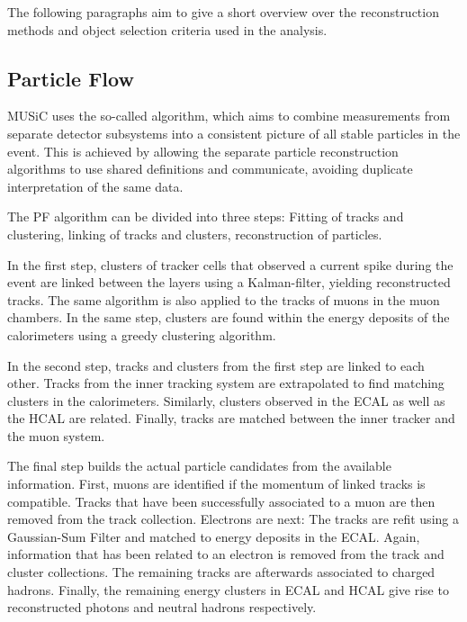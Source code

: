 The following paragraphs aim to give a short overview over the reconstruction methods and object selection criteria used in the analysis. 

\subsection{Particle Flow}
\ac{MUSiC} uses the so-called  algorithm\cite{CMS:CMS-PAS-PFT-09-001}, which aims to combine measurements from separate detector subsystems into a consistent picture of all stable particles in the event. This is achieved by allowing the separate particle reconstruction algorithms to use shared definitions and communicate, avoiding duplicate interpretation of the same data.

The \ac{PF} algorithm can be divided into three steps: Fitting of tracks and clustering, linking of tracks and clusters, reconstruction of particles.

In the first step, clusters of tracker cells that observed a current spike during the event are linked between the layers using a Kalman-filter, yielding reconstructed tracks. The same algorithm is also applied to the tracks of muons in the muon chambers. In the same step, clusters are found within the energy deposits of the calorimeters using a greedy clustering algorithm.

In the second step, tracks and clusters from the first step are linked to each other. Tracks from the inner tracking system are extrapolated to find matching clusters in the calorimeters. 
Similarly, clusters observed in the \ac{ECAL} as well as the \ac{HCAL} are related. Finally, tracks are matched between the inner tracker and the muon system.

The final step builds the actual particle candidates from the available information.
First, muons are identified if the momentum of linked tracks is compatible. Tracks that have been successfully associated to a muon are then removed from the track collection. Electrons are next: The tracks are refit using a Gaussian-Sum Filter and matched to energy deposits in the \ac{ECAL}. Again, information that has been related to an electron is removed from the track and cluster collections. The remaining tracks are afterwards associated to charged hadrons. Finally, the remaining energy clusters in \ac{ECAL} and \ac{HCAL} give rise to reconstructed photons and neutral hadrons respectively.

